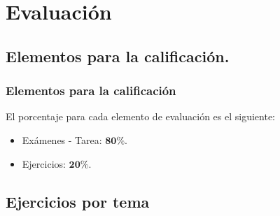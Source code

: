 \documentclass[12pt]{beamer}
\begin{document}
\section{Evaluación}
\subsection{Elementos para la calificación.}

\begin{frame}
\frametitle{Elementos para la calificación}
El porcentaje para cada elemento de evaluación es el siguiente:
\begin{itemize}
\setlength{\itemsep}{0mm}
\item Exámenes - Tarea: $\mathbf{80\%}$.
\item Ejercicios: $\mathbf{20\%}$.
\end{itemize}
\end{frame}

\subsection{Ejercicios por tema}
\end{document}
